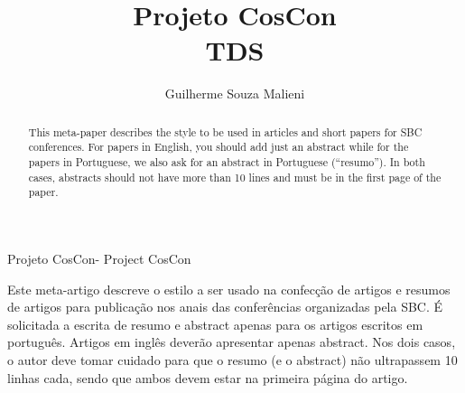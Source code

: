 \documentclass[12pt,a4paper,chapter=TITLE,section=TITLE,subsection=TITLE,subsubsection=TITLE]{article}
\title{Projeto CosCon\\ TDS }
\author{Guilherme Souza Malieni\inst{1} }
\begin{document}
  


\frenchspacing 


%
%

\maketitle
Projeto CosCon-
Project CosCon

\begin{abstract}
  This meta-paper describes the style to be used in articles and short papers
  for SBC conferences. For papers in English, you should add just an abstract
  while for the papers in Portuguese, we also ask for an abstract in
  Portuguese (``resumo''). In both cases, abstracts should not have more than
  10 lines and must be in the first page of the paper.
\end{abstract}
     
\begin{resumo1} 
  Este meta-artigo descreve o estilo a ser usado na confecção de artigos e
  resumos de artigos para publicação nos anais das conferências organizadas
  pela SBC. É solicitada a escrita de resumo e abstract apenas para os artigos
  escritos em português. Artigos em inglês deverão apresentar apenas abstract.
  Nos dois casos, o autor deve tomar cuidado para que o resumo (e o abstract)
  não ultrapassem 10 linhas cada, sendo que ambos devem estar na primeira
  página do artigo.
\end{resumo1}





\end{document}
